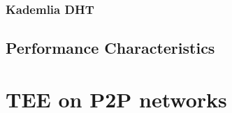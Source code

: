 \subsubsection{Kademlia DHT}%
\label{subsubsec:kademlia_dht}

\subsection{Performance Characteristics}%
\label{subsec:performance_characteristics}

\section{TEE on P2P networks}%
\label{sec:tee_p2p_networks}
